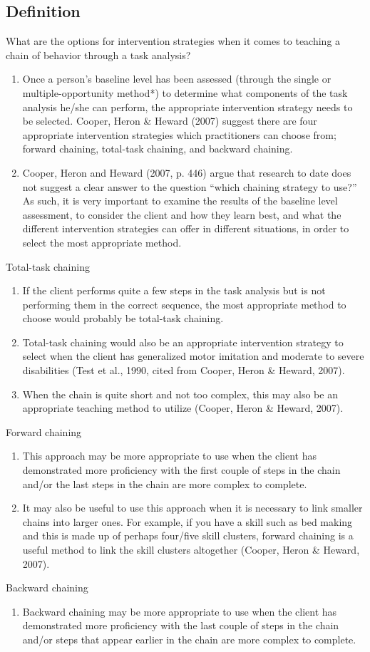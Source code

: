 \subsection{Definition}
What are the options for intervention strategies when it comes to teaching a chain of behavior through a task analysis?
\begin{enumerate}
\item Once a person's baseline level has been assessed (through the single or multiple-opportunity method*) to determine what components of the task analysis he/she can perform, the appropriate intervention strategy needs to be selected. Cooper, Heron \& Heward (2007) suggest there are four appropriate intervention strategies which practitioners can choose from; forward chaining, total-task chaining, and backward chaining.
\item Cooper, Heron and Heward (2007, p. 446) argue that research to date does not suggest a clear answer to the question ``which chaining strategy to use?'' As such, it is very important to examine the results of the baseline level assessment, to consider the client and how they learn best, and what the different intervention strategies can offer in different situations, in order to select the most appropriate method.
\end{enumerate}

Total-task chaining
\begin{enumerate}
\item If the client performs quite a few steps in the task analysis but is not performing them in the correct sequence, the most appropriate method to choose would probably be total-task chaining. 
\item Total-task chaining would also be an appropriate intervention strategy to select when the client has generalized motor imitation and moderate to severe disabilities (Test et al., 1990, cited from Cooper, Heron \& Heward, 2007).
\item When the chain is quite short and not too complex, this may also be an appropriate teaching method to utilize (Cooper, Heron \& Heward, 2007).
\end{enumerate}
%
Forward chaining
\begin{enumerate}
\item This approach may be more appropriate to use when the client has demonstrated more proficiency with the first couple of steps in the chain and/or the last steps in the chain are more complex to complete. 
\item It may also be useful to use this approach when it is necessary to link smaller chains into larger ones. For example, if you have a skill such as bed making and this is made up of perhaps four/five skill clusters, forward chaining is a useful method to link the skill clusters altogether (Cooper, Heron \& Heward, 2007).
\end{enumerate}
%
Backward chaining
\begin{enumerate}
\item Backward chaining may be more appropriate to use when the client has demonstrated more proficiency with the last couple of steps in the chain and/or steps that appear earlier in the chain are more complex to complete.
\end{enumerate}
%
